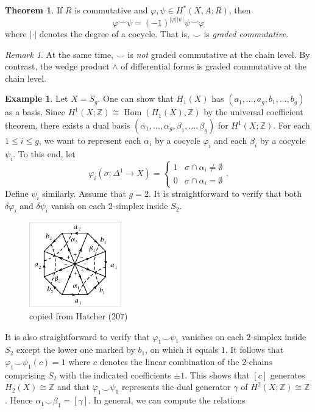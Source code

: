 \documentclass[10pt,letterpaper,cm]{nupset}
\theoremstyle{definition}
\newtheorem{exmp}[definition]{Example}
\theoremstyle{theorem}
\newtheorem{theorem}[definition]{Theorem}
\theoremstyle{remark}
\newtheorem{remark}[definition]{Remark}
\newcommand{\Z}{\mathbb Z}
\newcommand{\1}{\mathbb{1}}
\newcommand{\0}{\vec 0}
\DeclareMathOperator{\Hom}{Hom}
\begin{document}
\begin{theorem}
If $R$ is commutative and $\varphi, \psi \in H^{\ast}(X, A; R)$, then $$\varphi \smile \psi = ({-1})^{\left\lvert{\varphi}\right\rvert\left\lvert{\psi}\right\rvert} \psi \smile \varphi$$ where $\left\lvert{\cdot}\right\rvert$ denotes the degree of a cocycle. That is, $\smile$ is \textit{graded commutative}.
\end{theorem}

\begin{remark}
At the same time, $\smile$ is \emph{not} graded commutative at the chain level. By contrast, the wedge product $\wedge$ of differential forms is graded commutative at the chain level. 
\end{remark}

\begin{exmp}
Let $X = S_g$. One can show that $H_1(X)$ has $(a_1, \ldots, a_g, b_1, \ldots, b_g)$ as a basis. Since $H^1(X;\Z) \cong \Hom(H_1(X), \Z)$ by the universal coefficient theorem, there exists a dual basis $\left(\alpha_1, \ldots, \alpha_g, \beta_1, \ldots, \beta_g\right)$ for $H^1(X; \Z)$. 
For each $1\leq i\leq g$, we want to represent each $\alpha_i$ by a cocycle $\varphi_i$ and each $\beta_i$ by a cocycle $\psi_i$. To this end, let $$\varphi_i(\sigma : \Delta^1 \to X) = \begin{cases} 1 & \sigma \cap \alpha_i \ne \emptyset \\ 0 & \sigma \cap \alpha_i = \emptyset     \end{cases}.$$ Define $\psi_i$ similarly. Assume that $g=2$. It is straightforward to verify that both $\delta{\varphi_i}$ and $\delta{\psi_i}$ vanish on each $2$-simplex inside $S_2$.
\begin{figure}[H]
\centering
\includegraphics[width=40mm]{cup-prod-Sg.png}
\caption{copied from Hatcher (207) \label{overflow}}
\end{figure}
It is also straightforward to verify that $\varphi_1 \smile \psi_1$ vanishes on each $2$-simplex inside $S_2$ except the lower one marked by $b_1$, on which it equals $1$.
It follows that $\varphi_1 \smile \psi_1(c) =1$ where $c$ denotes the linear combination of the $2$-chains comprising $S_2$ with the indicated coefficients $\pm 1$. This shows that $[c]$ generates $H_2(X) \cong \Z$ and that $\varphi_1\smile \psi_1$ represents the dual generator $\gamma$ of $H^2(X; \Z) \cong \Z$. Hence $\alpha_1 \smile \beta_1 = [\gamma]$. In general, we can compute the relations

\end{exmp}
\end{document}
